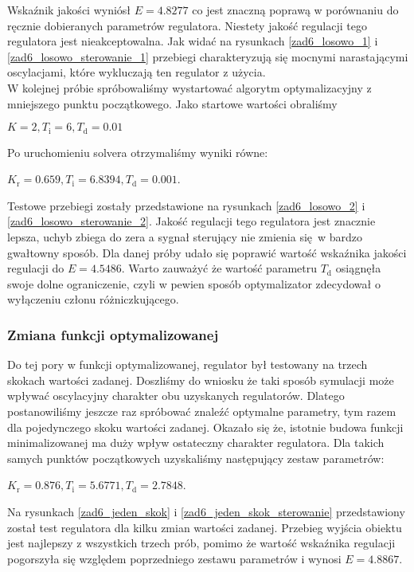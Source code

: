 Wskaźnik jakości wyniósł $E=\num{4.8277}$ co jest
znaczną poprawą w porównaniu do ręcznie dobieranych parametrów regulatora. 
Niestety jakość regulacji tego regulatora jest nieakceptowalna. Jak widać na rysunkach 
\ref{zad6_losowo_1} i \ref{zad6_losowo_sterowanie_1} przebiegi charakteryzują 
się mocnymi narastającymi oscylacjami, które wykluczają ten regulator z użycia.\\

W kolejnej próbie spróbowaliśmy wystartować algorytm optymalizacyjny z mniejszego
punktu początkowego. Jako startowe wartości obraliśmy
\begin{center}
$K = 2, T_{\mathrm{i}} = 6, T_{\mathrm{d}} = 0.01$ 
\end{center} Po uruchomieniu solvera otrzymaliśmy 
wyniki równe:
\begin{center}
$K_{\mathrm{r}} = \num{0.659}, T_{\mathrm{i}} = \num{6.8394}, T_{\mathrm{d}} = \num{0.001}$. 
\end{center}
Testowe przebiegi zostały przedstawione na rysunkach \ref{zad6_losowo_2} i 
\ref{zad6_losowo_sterowanie_2}. Jakość regulacji tego regulatora jest znacznie lepsza,
uchyb zbiega do zera a sygnał sterujący nie zmienia się w bardzo gwałtowny sposób.
Dla danej próby udało się poprawić wartość wskaźnika jakości regulacji do $E = \num{4.5486}$.
Warto zauważyć że wartość parametru $T_{\mathrm{d}}$ osiągnęła swoje dolne ograniczenie, czyli 
w pewien sposób optymalizator zdecydował o wyłączeniu członu różniczkującego.

\subsubsection{Zmiana funkcji optymalizowanej}
Do tej pory w funkcji optymalizowanej, regulator był testowany na trzech skokach wartości zadanej.
Doszliśmy do wniosku że taki sposób symulacji może wpływać oscylacyjny charakter obu uzyskanych regulatorów.
Dlatego postanowiliśmy jeszcze raz spróbować znaleźć optymalne parametry, tym razem dla pojedynczego skoku wartości zadanej.
Okazało się że, istotnie budowa funkcji minimalizowanej ma duży wpływ ostateczny charakter regulatora.
Dla takich samych punktów początkowych uzyskaliśmy następujący zestaw parametrów:
\begin{center}
    $K_{\mathrm{r}} = \num{0.876}, T_{\mathrm{i}} = \num{5.6771}, T_{\mathrm{d}} = \num{2.7848}$. 
\end{center}
Na rysunkach \ref{zad6_jeden_skok} i \ref{zad6_jeden_skok_sterowanie} przedstawiony został test regulatora
dla kilku zmian wartości zadanej. Przebieg wyjścia obiektu jest najlepszy z wszystkich trzech prób, pomimo że wartość
wskaźnika regulacji pogorszyła się względem poprzedniego zestawu parametrów i wynosi $E = \num{4,8867}$.

